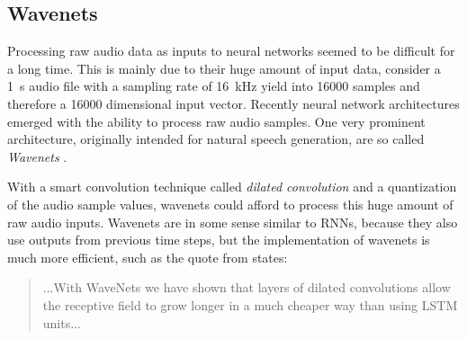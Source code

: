 
\subsection{Wavenets}\label{sec:prev_nn_wavenet}

Processing raw audio data as inputs to neural networks seemed to be difficult for a long time.
This is mainly due to their huge amount of input data, consider a \SI{1}{\second} audio file with a sampling rate of \SI{16}{\kilo\hertz} yield into 16000 samples and therefore a 16000 dimensional input vector.
Recently neural network architectures emerged with the ability to process raw audio samples.
One very prominent architecture, originally intended for natural speech generation, are so called \emph{Wavenets} \cite{Oord2016}.

With a smart convolution technique called \emph{dilated convolution} and a quantization of the audio sample values, wavenets could afford to process this huge amount of raw audio inputs.
Wavenets are in some sense similar to RNNs, because they also use outputs from previous time steps, but the implementation of wavenets is much more efficient, such as the quote from \cite{Oord2016} states:
\begin{quote}
  ...With WaveNets we have shown that layers of dilated convolutions allow the receptive field to grow longer in a much cheaper way than using LSTM units...
\end{quote}